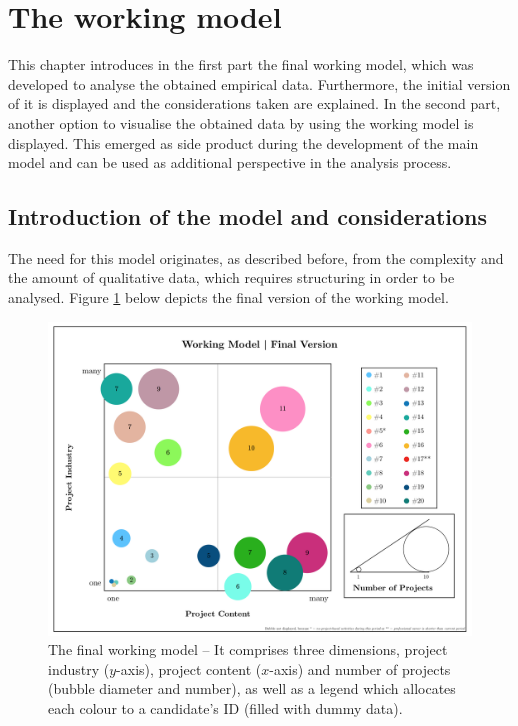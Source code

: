 \cleardoublepage

\section{The working model}
\label{sec:workframe}

This chapter introduces in the first part the final working model, which was developed to analyse the obtained empirical data. Furthermore, the initial version of it is displayed and the considerations taken are explained. In the second part, another option to visualise the obtained data by using the working model is displayed. This emerged as side product during the development of the main model and can be used as additional perspective in the analysis process.


\subsection{Introduction of the model and considerations}
The need for this model originates, as described before, from the complexity and the amount of qualitative data, which requires structuring in order to be analysed. Figure \ref{fig:final} below depicts the final version of the working model.\\

\begin{figure}[!hbt]
    \captionsetup{font=small}
  \centering
  \includegraphics[width=.7\columnwidth]{figures/WM_final.png}
  \caption[The final working model]{The final working model – It comprises three dimensions, project industry ($y$-axis), project content ($x$-axis) and number of projects (bubble diameter and number), as well as a legend which allocates each colour to a candidate's ID (filled with dummy data).}
  \label{fig:final}
\end{figure}

